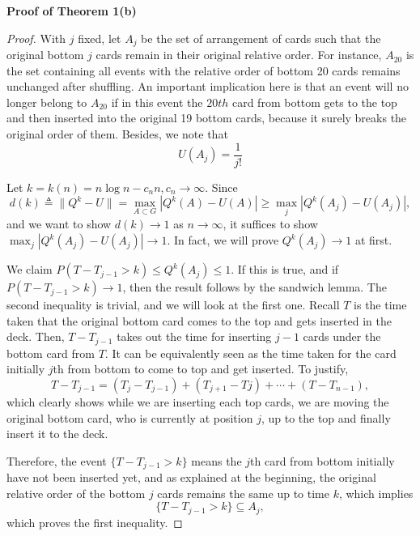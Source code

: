 \documentclass[12pt]{article}
\theoremstyle{plain}
\theoremstyle{definition}
\theoremstyle{remark}
\begin{document}
\textbf{Proof of Theorem 1(b)}\cite{1.1}
\begin{proof}
With $j$ fixed, let $A_j$ be the set of arrangement of cards such that the original bottom $j$ cards remain in their original relative order. For instance, $A_{20}$ is the set containing all events with the relative order of bottom 20 cards remains unchanged after shuffling. An important implication here is that an event will no longer belong to $A_{20}$ if in this event the $20th$ card from bottom gets to the top and then inserted into the original 19 bottom cards, because it surely breaks the original order of them. Besides, we note that $$U(A_j)=\frac{1}{j!}$$

Let $k=k(n)=n\log n-c_nn,c_n\rightarrow\infty.$ Since $$d(k)\triangleq \|Q^k-U\|=
    \max_{A\subset G}|Q^k(A)-U(A)|\geq \max_{j}|Q^k(A_j)-U(A_j)|,$$
and we want to show $d(k)\rightarrow 1$ as $n\rightarrow \infty$, it suffices to show $\max_{j}|Q^k(A_j)-U(A_j)|\rightarrow 1$. In fact, we will prove $Q^k(A_j)\rightarrow 1$ at first. 

We claim $P(T-T_{j-1}>k)\leq Q^k(A_j)\leq 1$. If this is true, and if $P(T-T_{j-1}>k)\longrightarrow 1$, then the result follows by the sandwich lemma. The second inequality is trivial, and we will look at the first one. Recall $T$ is the time taken that the original bottom card comes to the top and gets inserted in the deck. Then, $T-T_{j-1}$ takes out the time for inserting $j-1$ cards under the bottom card from $T$. It can be equivalently seen as the time taken for the card initially $j$th from bottom to come to top and get inserted. To justify, $$T-T_{j-1}=(T_j-T_{j-1})+(T_{j+1}-T{j})+\cdots+(T-T_{n-1}),$$ 
which clearly shows while we are inserting each top cards, we are moving the original bottom card, who is currently at position $j$, up to the top and finally insert it to the deck.  

Therefore, the event $\{T-T_{j-1}>k\}$ means the $j$th card from bottom initially have not been inserted yet, and as explained at the beginning, the original relative order of the bottom $j$ cards remains the same up to time $k$, which implies $$\{T-T_{j-1}>k\}\subseteq A_j,$$
which proves the first inequality. 


\end{proof}
\end{document}
